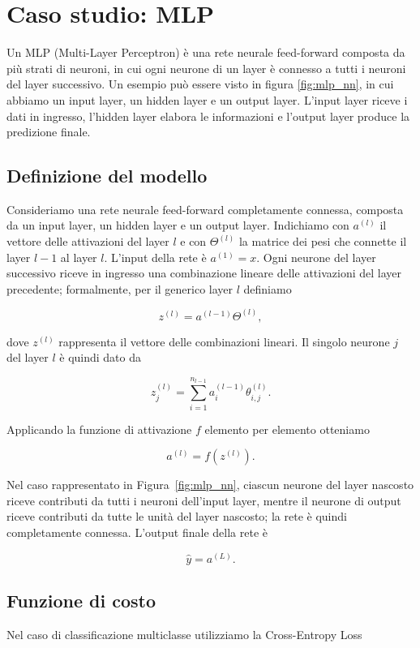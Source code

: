 \section{Caso studio: MLP}
Un MLP (Multi-Layer Perceptron) è una rete neurale feed-forward composta da più strati di neuroni, in cui ogni neurone di un layer è connesso a tutti i neuroni del layer successivo. Un esempio può essere visto in figura \ref{fig:mlp_nn}, in cui abbiamo un input layer, un hidden layer e un output layer. L’input layer riceve i dati in ingresso, l'hidden layer elabora le informazioni e l’output layer produce la predizione finale.

\subsection{Definizione del modello}
Consideriamo una rete neurale feed-forward completamente connessa, composta da un input layer, un hidden layer e un output layer. Indichiamo con $a^{(l)}$ il vettore delle attivazioni del layer $l$ e con $\Theta^{(l)}$ la matrice dei pesi che connette il layer $l-1$ al layer $l$. L’input della rete è $a^{(1)} = x$. Ogni neurone del layer successivo riceve in ingresso una combinazione lineare delle attivazioni del layer precedente; formalmente, per il generico layer $l$ definiamo

\[
z^{(l)} = a^{(l-1)} \Theta^{(l)},
\]

dove $z^{(l)}$ rappresenta il vettore delle combinazioni lineari. Il singolo neurone $j$ del layer $l$ è quindi dato da

\[
z_j^{(l)} = \sum_{i=1}^{n_{l-1}} a_i^{(l-1)} \theta_{i,j}^{(l)}.
\]

Applicando la funzione di attivazione $f$ elemento per elemento otteniamo

\[
a^{(l)} = f(z^{(l)}).
\]

Nel caso rappresentato in Figura~\ref{fig:mlp_nn}, ciascun neurone del layer nascosto riceve contributi da tutti i neuroni dell’input layer, mentre il neurone di output riceve contributi da tutte le unità del layer nascosto; la rete è quindi completamente connessa. L’output finale della rete è

\[
\hat{y} = a^{(L)}.
\]

\subsection{Funzione di costo}
Nel caso di classificazione multiclasse utilizziamo la Cross-Entropy Loss

